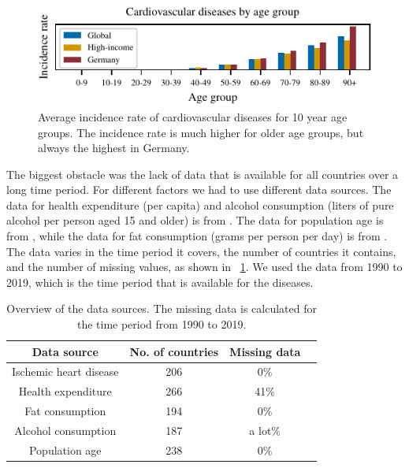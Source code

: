 \begin{figure}[ht]
\vskip 0.2in
\begin{center}
\centerline{\includegraphics[width=\columnwidth]{fig/fig_cardiovascular_disease_agerange.pdf}}
\caption{Average incidence rate of cardiovascular diseases for 10 year age groups. The incidence rate is much higher for older age groups, but 
always the highest in Germany.}
\label{Cardiovascular diseases for age groups}
\end{center}
\vskip -0.2in
\end{figure}

The biggest obstacle was the lack of data that is available for all countries over a long time period. For different factors we had to use different data sources.
The data for health expenditure (per capita) and alcohol consumption (liters of pure alcohol per person aged 15 and older) is from \citet{oecd}. 
The data for population age is from \citet{age}, while the data for fat consumption (grams per person per day) is from \citet{fat_consumption}. The data varies in the time period it covers,
the number of countries it contains, and the number of missing values, as shown in \tablename~\ref{Data overview}. We used the data from 1990 to 2019, which is the time period
that is available for the diseases.

\begin{table}[h]
    \centering
    \caption{Overview of the data sources. The missing data is calculated for the time period from 1990 to 2019.}
    \label{Data overview}
    \begin{tabular}{|c|c|c|c|}
    \hline
    Data source & No. of countries & Missing data\\
    \hline
    Ischemic heart disease & 206 & 0\%\\
    Health expenditure & 266 & 41\%\\
    Fat consumption & 194 & 0\%\\
    Alcohol consumption & 187 & a lot\%\\
    Population age & 238 & 0\%\\
    \hline
    \end{tabular}
\end{table}

